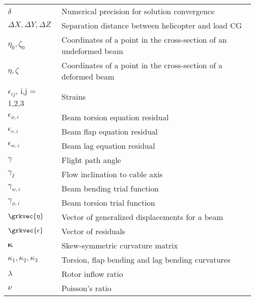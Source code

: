 \begin{tabular}{ll}
$\delta$ & Numerical precision for solution convergence \\
$\Delta X, \Delta Y, \Delta Z$ & Separation distance between helicopter and load CG  \\
$\eta_0, \zeta_0$ & Coordinates of a point in the cross-section of an undeformed beam \\
$\eta, \zeta$ & Coordinates of a point in the cross-section of a deformed beam \\
$\epsilon_{ij}$, i,j = 1,2,3 & Strains \\
$\epsilon_{\phi,i}$ & Beam torsion equation residual \\
$\epsilon_{v,i}$ & Beam flap equation residual \\
$\epsilon_{w,i}$ & Beam lag equation residual \\
$\gamma$ & Flight path angle \\
$\gamma_I$ & Flow inclination to cable axis \\
$\gamma_{w,i}$ & Beam bending trial function \\
$\gamma_{\phi,i}$ & Beam torsion trial function \\
$\grkvec{\eta}$ & Vector of generalized displacements for a beam \\
$\grkvec{\epsilon}$ & Vector of residuals \\
$\boldsymbol\kappa$ & Skew-symmetric curvature matrix \\
$\kappa_1, \kappa_2, \kappa_3$ & Torsion, flap bending and lag bending curvatures \\
$\lambda$   & Rotor inflow ratio \\
$\nu$ & Poisson's ratio \\
\end{tabular}
 
